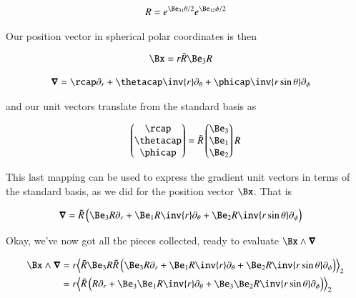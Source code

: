\begin{align}\label{eqn:qmAngularMom:goo1}
R = e^{\Be_{31}\theta/2} e^{\Be_{12}\phi/2}
\end{align}

Our position vector in spherical polar coordinates is then

\begin{align}\label{eqn:qmAngularMom:goo2}
\Bx &= r \tilde{R} \Be_3 R 
\end{align}

\begin{align}\label{eqn:qmAngularMom:goo3}
\spacegrad &= \rcap \partial_r + \thetacap \inv{r} \partial_\theta + \phicap \inv{r \sin\theta} \partial_\phi
\end{align}

and our unit vectors translate from the standard basis as

\begin{align}\label{eqn:qmAngularMom:goo4}
\begin{pmatrix}
\rcap \\
\thetacap \\
\phicap \\
\end{pmatrix}
=
\tilde{R}
\begin{pmatrix}
\Be_3 \\
\Be_1 \\
\Be_2 \\
\end{pmatrix}
R
\end{align}

This last mapping can be used to express the gradient unit vectors in terms of the standard basis, as we did for the position vector $\Bx$.  That is

\begin{align}\label{eqn:qmAngularMom:goo5}
\spacegrad &= \tilde{R} \left( \Be_3 R \partial_r + \Be_1 R \inv{r} \partial_\theta + \Be_2 R \inv{r \sin\theta} \partial_\phi \right)
\end{align}

Okay, we've now got all the pieces collected, ready to evaluate $\Bx \wedge \spacegrad$

\begin{align*}
\Bx \wedge \spacegrad 
&=
r \gpgradetwo{\tilde{R} \Be_3 R 
\tilde{R} \left( \Be_3 R \partial_r + \Be_1 R \inv{r} \partial_\theta + \Be_2 R \inv{r \sin\theta} \partial_\phi \right) } \\
&=
r \gpgradetwo{\tilde{R} \left( R \partial_r + \Be_3 \Be_1 R \inv{r} \partial_\theta + \Be_3 \Be_2 R \inv{r \sin\theta} \partial_\phi \right) } \\
\end{align*}

